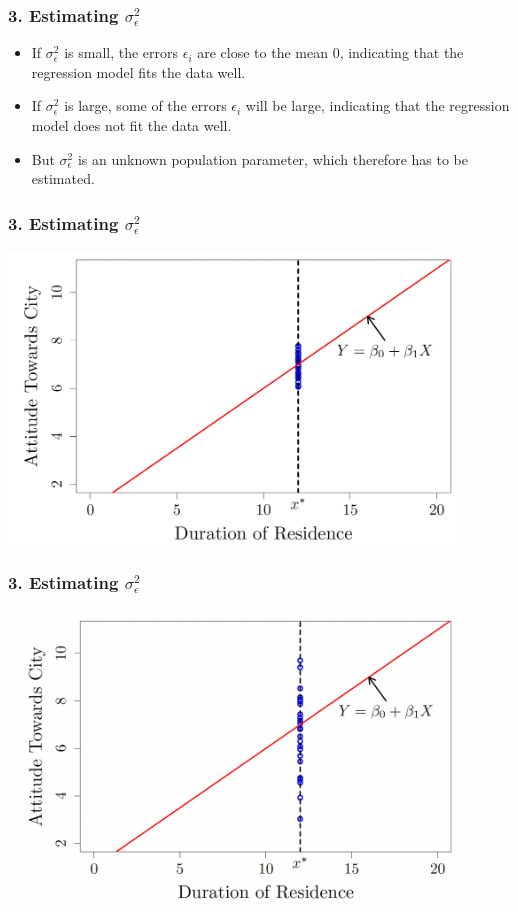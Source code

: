 \documentclass[12pt]{beamer}
\begin{document}
\begin{frame}
	\frametitle{3. Estimating $\sigma_\epsilon^2$}
	
	\begin{itemize}[label={\color{blue}$\blacktriangleright$}]
		\item If $\sigma_\epsilon^2$ is small, the errors $\epsilon_i$ are close to the mean 0, indicating that the regression model fits the data well.
		
		\item If $\sigma_\epsilon^2$ is large, some of the errors $\epsilon_i$ will be large, indicating that the regression model does not fit the data well.
		
		\item But $\sigma_\epsilon^2$ is an unknown population parameter, which therefore has to be estimated.
	\end{itemize}
\end{frame}
\begin{frame}
	\frametitle{3. Estimating $\sigma_\epsilon^2$}
	
	\centering
\includegraphics[width=12cm]{sigma2.png}
\end{frame}
\begin{frame}
	\frametitle{3. Estimating $\sigma_\epsilon^2$}
	
	\centering
	\includegraphics[width=12cm]{sigma3.png}
\end{frame}
\end{document}
